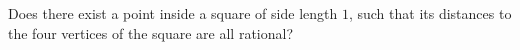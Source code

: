 Does there exist a point inside a square of side length $1$,
such that its distances to the four vertices of the square are all rational?
